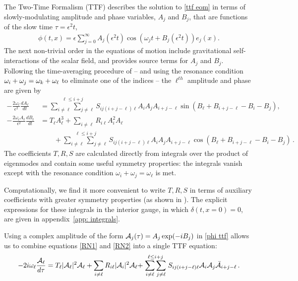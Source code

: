\documentclass[../PhD.tex]{subfiles}
\begin{document}
The Two-Time Formalism (TTF) describes the solution to \eqref{ttf eom} in terms of slowly-modulating amplitude and phase variables, $A_j$ and $B_j$, that are functions of the slow time $\tau = \epsilon^2 t$,
\begin{align}
\label{phi ttf}
\phi(t,x) = \epsilon \sum_{j=0}^\infty A_j (\epsilon^2 t) \cos \left(\omega_j t + B_j(\epsilon^2 t) \right) e_j(x) .
\end{align}
The next non-trivial order in the equations of motion include gravitational self-interactions of the scalar field, and provides source terms for $A_j$ and $B_j$. Following the time-averaging procedure of \cite{1407.6273} -- and using the resonance condition $\omega_i + \omega_j = \omega_k + \omega_\ell$ to eliminate one of the indices -- the $\ell^{th}$ amplitude and phase are given by
\begin{align}
\label{RN1}
-\frac{2\omega_\ell}{\epsilon^2} \frac{d A_\ell}{d t} &= \stackrel{\ell \leq i + j}{\sum_{i \neq \ell} \sum_{j \neq \ell}} S_{ij (i + j -\ell) \ell} A_i A_j A_{i + j - \ell} \sin \left( B_\ell + B_{i+j-\ell} - B_i - B_j \right) , \\
\label{RN2}
- \frac{2 \omega_\ell A_\ell}{\epsilon^2} \frac{d B_\ell}{dt} &= T_\ell A_\ell^3 + \sum_{i \neq \ell} R_{i \ell} A^2_i A_\ell  \nonumber \\
& \qquad + \stackrel{\ell \leq i + j}{\sum_{i \neq \ell} \sum_{j \neq \ell}} S_{ij (i + j -\ell) \ell} A_i A_j A_{i + j - \ell} \cos \left( B_\ell + B_{i+j-\ell} - B_i - B_j \right) \, .
\end{align}
The coefficients $T, R, S$ are calculated directly from integrals over the product of eigenmodes and contain some useful symmetry properties: the integrals vanish except with the resonance condition $\omega_i + \omega_j = \omega_\ell$ is met. 

Computationally, we find it more convenient to write $T, R, S$ in terms of auxiliary coefficients with greater symmetry properties (as shown in \cite{1508.04943}). The explicit expressions for these integrals in the interior gauge, in which $\delta(t,x=0)=0$, are given in appendix~\ref{app: integrals}. 

Using a complex amplitude of the form $\mathcal A_j(\tau) = A_j \exp (-i B_j )$ in \eqref{phi ttf} allows us to combine equations \eqref{RN1} and \eqref{RN2} into a single TTF equation:
\begin{align}
\label{ttf eqn}
-2i \omega_\ell \frac{\mathcal A_\ell}{d \tau} = T_\ell |\mathcal A_\ell|^2 \mathcal A_\ell + \sum_{i \neq \ell} R_{i\ell} |\mathcal A_i|^2 \mathcal A_\ell + \stackrel{\ell \leq i+j}{\sum_{i \neq \ell} \sum_{j \neq \ell}} S_{ij(i+j-\ell)\ell} \mathcal A_i \mathcal A_j \bar{\mathcal A}_{i+j-\ell} \, .
\end{align}
\end{document}
